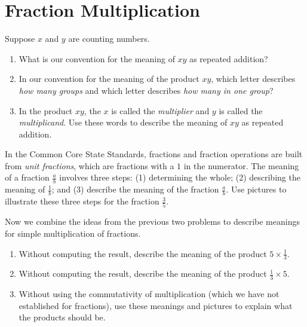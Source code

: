 \newpage
\section{Fraction Multiplication}\label{A:fractionMultiplication}

\begin{prob}
Suppose $x$ and $y$ are counting numbers.  
\begin{enumerate}
\item What is our convention for the meaning of $xy$ as repeated addition?  
\item In our convention for the meaning of the product $xy$, which letter describes 
\emph{how many groups} and which letter describes \emph{how many in one group}? 
\item In the product $xy$, the $x$ is called the \emph{multiplier} and $y$ is called the \emph{multiplicand}.  
Use these words to describe the meaning of $xy$ as repeated addition. 
\end{enumerate}
\end{prob}

\vspace{1in}

\begin{prob}
In the Common Core State Standards, fractions and fraction operations are built from \emph{unit fractions}, which are fractions with a $1$ in the numerator.  The meaning of a fraction $\frac{a}{b}$ involves three steps: (1) determining the whole; (2) describing the meaning of $\frac{1}{b}$; and (3) describe the meaning of the fraction $\frac{a}{b}$.  Use pictures to illustrate these three steps for the fraction
$\frac{3}{5}$.  
\end{prob}

\vspace{1in}

\begin{prob}
Now we combine the ideas from the previous two problems to describe meanings for simple multiplication of fractions.  
\begin{enumerate}
\item Without computing the result, describe the meaning of the product $5 \times \frac{1}{3}$.
\item Without computing the result, describe the meaning of the product $\frac{1}{3}\times 5$.
\item Without using the commutativity of multiplication (which we have not established for fractions), 
use these meanings and pictures to explain what the products should be. 
\end{enumerate}
\end{prob}

